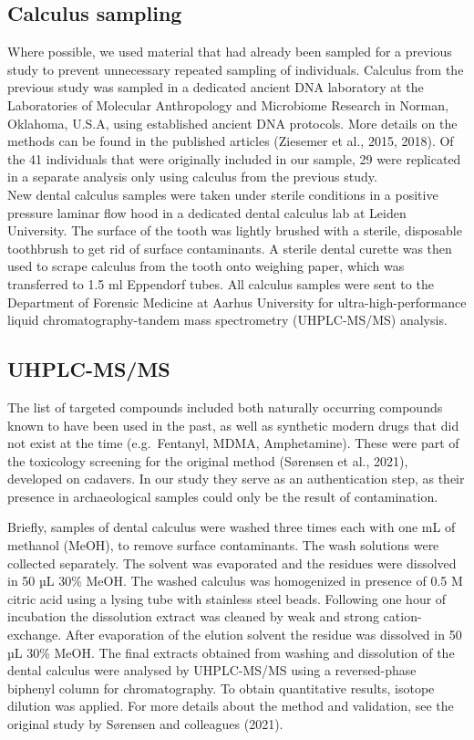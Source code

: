 \documentclass[
  letterpaper,
]{book}
\begin{document}
\hypertarget{calculus-sampling}{%
\subsection{Calculus sampling}\label{calculus-sampling}}

Where possible, we used material that had already been sampled for a
previous study to prevent unnecessary repeated sampling of individuals.
Calculus from the previous study was sampled in a dedicated ancient DNA
laboratory at the Laboratories of Molecular Anthropology and Microbiome
Research in Norman, Oklahoma, U.S.A, using established ancient DNA
protocols. More details on the methods can be found in the published
articles (Ziesemer et al., 2015, 2018). Of the 41 individuals that were
originally included in our sample, 29 were replicated in a separate
analysis only using calculus from the previous study.\\
New dental calculus samples were taken under sterile conditions in a
positive pressure laminar flow hood in a dedicated dental calculus lab
at Leiden University. The surface of the tooth was lightly brushed with
a sterile, disposable toothbrush to get rid of surface contaminants. A
sterile dental curette was then used to scrape calculus from the tooth
onto weighing paper, which was transferred to 1.5 ml Eppendorf tubes.
All calculus samples were sent to the Department of Forensic Medicine at
Aarhus University for ultra-high-performance liquid
chromatography-tandem mass spectrometry (UHPLC-MS/MS) analysis.

\hypertarget{uhplc-msms}{%
\subsection{UHPLC-MS/MS}\label{uhplc-msms}}

The list of targeted compounds included both naturally occurring
compounds known to have been used in the past, as well as synthetic
modern drugs that did not exist at the time (e.g.~Fentanyl, MDMA,
Amphetamine). These were part of the toxicology screening for the
original method (Sørensen et al., 2021), developed on cadavers. In our
study they serve as an authentication step, as their presence in
archaeological samples could only be the result of contamination.

Briefly, samples of dental calculus were washed three times each with
one mL of methanol (MeOH), to remove surface contaminants. The wash
solutions were collected separately. The solvent was evaporated and the
residues were dissolved in 50 µL 30\% MeOH. The washed calculus was
homogenized in presence of 0.5 M citric acid using a lysing tube with
stainless steel beads. Following one hour of incubation the dissolution
extract was cleaned by weak and strong cation-exchange. After
evaporation of the elution solvent the residue was dissolved in 50 µL
30\% MeOH. The final extracts obtained from washing and dissolution of
the dental calculus were analysed by UHPLC-MS/MS using a reversed-phase
biphenyl column for chromatography. To obtain quantitative results,
isotope dilution was applied. For more details about the method and
validation, see the original study by Sørensen and colleagues (2021).
\end{document}
